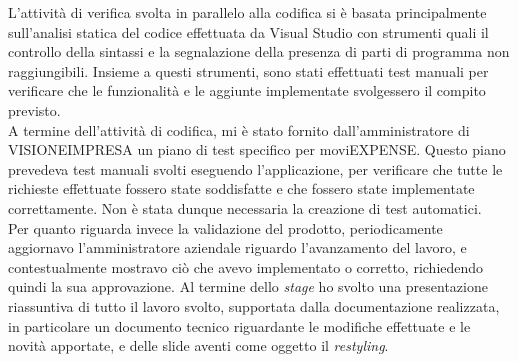 L'attività di verifica svolta in parallelo alla codifica si è basata principalmente sull'analisi statica del codice effettuata da Visual Studio con strumenti quali il controllo della sintassi e la segnalazione della presenza di parti di programma non raggiungibili. Insieme a questi strumenti, sono stati effettuati test manuali per verificare che le funzionalità e le aggiunte implementate svolgessero il compito previsto.\\
A termine dell'attività di codifica, mi è stato fornito dall'amministratore di VISIONEIMPRESA un piano di test specifico per moviEXPENSE. Questo piano prevedeva test manuali svolti eseguendo l'applicazione, per verificare che tutte le richieste effettuate fossero state soddisfatte e che fossero state implementate correttamente. Non è stata dunque necessaria la creazione di test automatici.\\
Per quanto riguarda invece la validazione del prodotto, periodicamente aggiornavo l'amministratore aziendale riguardo l'avanzamento del lavoro, e contestualmente mostravo ciò che avevo implementato o corretto, richiedendo quindi la sua approvazione. Al termine dello \textit{stage} ho svolto una presentazione riassuntiva di tutto il lavoro svolto, supportata dalla documentazione realizzata, in particolare un documento tecnico riguardante le modifiche effettuate e le novità apportate, e delle slide aventi come oggetto il \textit{restyling}.
